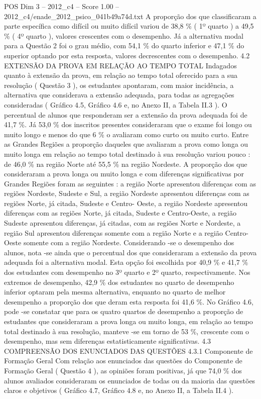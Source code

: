 \begin{textsample}{POS Dim 3 – 2012\_c4 – Score 1.00 – 2012\_c4/enade\_2012\_psico\_041b49a74d.txt}
A proporção dos que classificaram a parte específica como difícil ou muito difícil variou de 38,8 \% ( 1º quarto ) a 49,5 \% ( 4º quarto ), valores crescentes com o desempenho.
Já a alternativa modal para a Questão 2 foi o grau médio, com 54,1 \% do quarto inferior e 47,1 \% do superior optando por esta resposta, valores decrescentes com o desempenho. 4.2 EXTENSÃO DA PROVA EM RELAÇÃO AO TEMPO TOTAL Indagados quanto à extensão da prova, em relação ao tempo total oferecido para a sua resolução ( Questão 3 ), os estudantes apontaram, com maior incidência, a alternativa que considerava a extensão adequada, para todas as agregações consideradas ( Gráfico 4.5, Gráfico 4.6 e, no Anexo II, a Tabela II.3 ).
O percentual de alunos que responderam ser a extensão da prova adequada foi de 41,7 \%.
Já 53,0 \% dos inscritos presentes consideraram que o exame foi longo ou muito longo e menos do que 6 \% o avaliaram como curto ou muito curto.
Entre as Grandes Regiões a proporção daqueles que avaliaram a prova como longa ou muito longa em relação ao tempo total destinado à sua resolução variou pouco : de 46,0 \% na região Norte até 55,5 \% na região Nordeste.
A proporção dos que consideraram a prova longa ou muito longa e com diferenças significativas por Grandes Regiões foram as seguintes : a região Norte apresentou diferenças com as regiões Nordeste, Sudeste e Sul, a região Nordeste apresentou diferenças com as regiões Norte, já citada, Sudeste e Centro- Oeste, a região Nordeste apresentou diferenças com as regiões Norte, já citada, Sudeste e Centro-Oeste, a região Sudeste apresentou diferenças, já citadas, com as regiões Norte e Nordeste, a região Sul apresentou diferenças somente com a região Norte e a região Centro-Oeste somente com a região Nordeste.
Considerando -se o desempenho dos alunos, nota -se ainda que o percentual dos que consideraram a extensão da prova adequada foi a alternativa modal.
Esta opção foi escolhida por 40,9 \% e 41,7 \% dos estudantes com desempenho no 3º quarto e 2º quarto, respectivamente.
Nos extremos de desempenho, 42,9 \% dos estudantes no quarto de desempenho inferior optaram pela mesma alternativa, enquanto no quarto de melhor desempenho a proporção dos que deram esta resposta foi 41,6 \%.
No Gráfico 4.6, pode -se constatar que para os quatro quartos de desempenho a proporção de estudantes que consideraram a prova longa ou muito longa, em relação ao tempo total destinado à sua resolução, manteve -se em torno de 53 \%, crescente com o desempenho, mas sem diferenças estatisticamente significativas. 4.3 COMPREENSÃO DOS ENUNCIADOS DAS QUESTÕES 4.3.1 Componente de Formação Geral Com relação aos enunciados das questões do Componente de Formação Geral ( Questão 4 ), as opiniões foram positivas, já que 74,0 \% dos alunos avaliados consideraram os enunciados de todas ou da maioria das questões claros e objetivos ( Gráfico 4.7, Gráfico 4.8 e, no Anexo II, a Tabela II.4 ).

\end{textsample}
